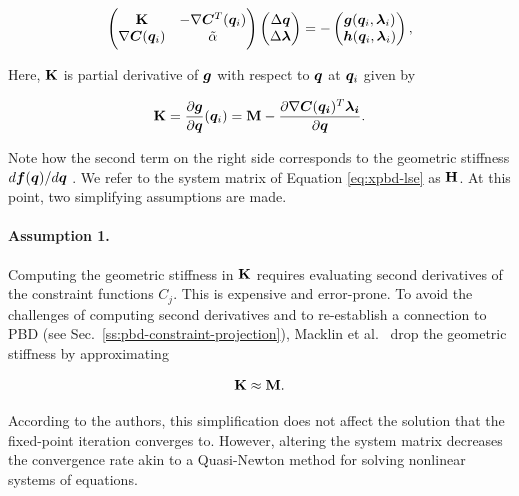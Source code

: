 \begin{equation}\label{eq:xpbd-lse}
    \begin{pmatrix}
        \mathbf{K} & -\nabla\bm{C}^T(\bm{q}_i)\\
        \nabla\bm{C}(\bm{q}_i) & \tilde{\mathbf{\alpha}}
    \end{pmatrix}
    \begin{pmatrix}
        \Delta \bm{q} \\
        \Delta \bm{\lambda}
    \end{pmatrix}
    = -
    \begin{pmatrix}
    \bm{g}(\bm{q}_i, \bm{\lambda}_i) \\
    \bm{h}(\bm{q}_i, \bm{\lambda}_i)
    \end{pmatrix},
\end{equation}

\noindent Here, $\mathbf{K}$ is partial derivative of $\bm{g}$ with respect to $\bm{q}$ at $\bm{q}_i$ given by

\begin{equation}\label{eq:xpbd-K}
    \mathbf{K} = \frac{\partial \bm{g}}{\partial \bm{q}}(\bm{q}_i) = \mathbf{M} - \frac{\partial \nabla \bm{C}(\bm{q_i})^T \bm{\lambda_i}}{\partial \bm{q}}.
\end{equation}

\noindent Note how the second term on the right side corresponds to the geometric stiffness $d\bm{f}(\bm{q})/d\bm{q}$ 
\cite{tournier2015}. We refer to the system matrix of Equation \ref{eq:xpbd-lse} as $\mathbf{H}$. At this point, two simplifying assumptions 
are made.

\paragraph{Assumption 1.} Computing the geometric stiffness in $\mathbf{K}$ requires evaluating second derivatives of the constraint functions
$C_j$. This is expensive and error-prone. To avoid the challenges of computing second derivatives and to re-establish a connection 
to PBD (see Sec.\ \ref{ss:pbd-constraint-projection}), Macklin et al.\ \cite{macklin2016} drop the geometric stiffness by approximating 

\begin{equation}\label{eq:xpbd-assumption-1}
    \mathbf{K} \approx \mathbf{M}. 
\end{equation}

\noindent According to the authors, this simplification does not affect the solution that the fixed-point iteration converges to. However, 
altering the system matrix decreases the convergence rate akin to a Quasi-Newton method for solving nonlinear systems of equations.

